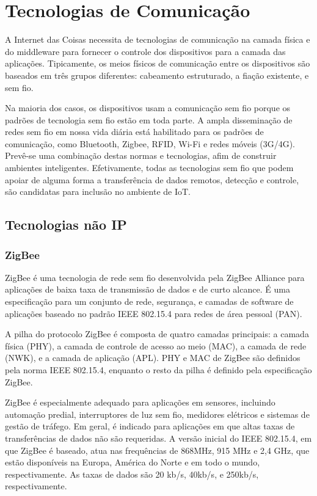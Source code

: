\section{Tecnologias de Comunicação}

A Internet das Coisas necessita de tecnologias de comunicação na camada
física e do middleware para fornecer o controle dos dispositivos para
a camada das aplicações. Tipicamente, os meios físicos de comunicação
entre os dispositivos são baseados em três grupos diferentes: cabeamento
estruturado, a fiação existente, e sem fio\cite{ngo2007}.

Na maioria dos casos, os dispositivos usam a comunicação sem fio porque
os padrões de tecnologia sem fio estão em toda parte. A ampla disseminação
de redes sem fio em nossa vida diária está habilitado para os padrões
de comunicação, como Bluetooth, Zigbee, RFID, Wi-Fi e redes móveis
(3G/4G). Prevê-se uma combinação destas normas e tecnologias, afim
de construir ambientes inteligentes. Efetivamente, todas as tecnologias
sem fio que podem apoiar de alguma forma a transferência de dados
remotos, detecção e controle, são candidatas para inclusão no ambiente
de IoT.

\subsection{Tecnologias não IP}

\subsubsection{ZigBee}

ZigBee é uma tecnologia de rede sem fio desenvolvida pela ZigBee Alliance
para aplicações de baixa taxa de transmissão de dados e de curto alcance\cite{alliance2007}.
É uma especificação para um conjunto de rede, segurança, e camadas
de software de aplicações baseado no padrão IEEE 802.15.4 para redes
de área pessoal (PAN)\cite{hwang2012}.

A pilha do protocolo ZigBee é composta de quatro camadas principais:
a camada física (PHY), a camada de controle de acesso ao meio (MAC),
a camada de rede (NWK), e a camada de aplicação (APL). PHY e MAC de
ZigBee são definidos pela norma IEEE 802.15.4, enquanto o resto da
pilha é definido pela especificação ZigBee.

ZigBee é especialmente adequado para aplicações em sensores, incluindo
automação predial, interruptores de luz sem fio, medidores elétricos
e sistemas de gestão de tráfego. Em geral, é indicado para aplicações
em que altas taxas de transferências de dados não são requeridas.
A versão inicial do IEEE 802.15.4, em que ZigBee é baseado, atua nas
frequências de 868MHz, 915 MHz e 2,4 GHz, que estão disponíveis na
Europa, América do Norte e em todo o mundo, respectivamente. As taxas
de dados são 20 kb/s, 40kb/s, e 250kb/s, respectivamente\cite{gomez2010wireless}.

